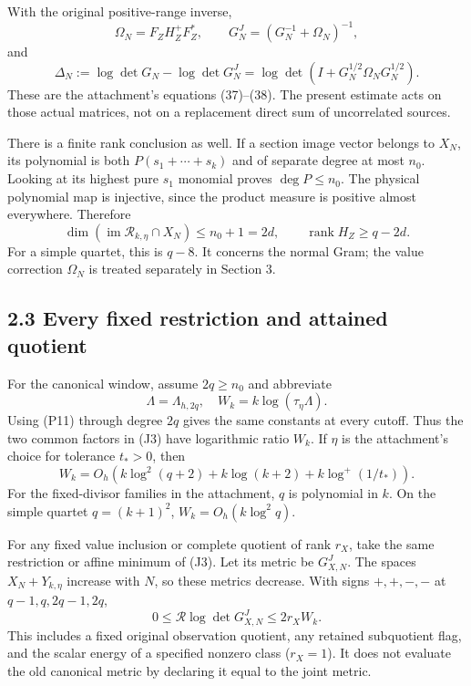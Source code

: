 With the original positive-range inverse, \[
 \Omega_N=F_ZH_Z^+F_Z^*,\qquad
 G_N^J=(G_N^{-1}+\Omega_N)^{-1}, \tag{J7}
\] and \[
 \Delta_N:=\log\det G_N-\log\det G_N^J
 =\log\det(I+G_N^{1/2}\Omega_NG_N^{1/2}). \tag{J8}
\] These are the attachment's equations (37)--(38). The present estimate acts on those actual matrices, not on a replacement direct sum of uncorrelated sources.

There is a finite rank conclusion as well. If a section image vector belongs to \(X_N\), its polynomial is both \(P(s_1+\cdots+s_k)\) and of separate degree at most \(n_0\). Looking at its highest pure \(s_1\) monomial proves \(\deg P\le n_0\). The physical polynomial map is injective, since the product measure is positive almost everywhere. Therefore \[
 \dim(\operatorname{im}\mathcal R_{k,\eta}\cap X_N)\le n_0+1=2d,
 \qquad
 \boxed{\operatorname{rank}H_Z\ge q-2d.} \tag{J9}
\] For a simple quartet, this is \(q-8\). It concerns the normal Gram; the value correction \(\Omega_N\) is treated separately in Section 3.

\subsection{2.3 Every fixed restriction and attained quotient}\label{every-fixed-restriction-and-attained-quotient}

For the canonical window, assume \(2q\ge n_0\) and abbreviate \[
 \Lambda=\Lambda_{h,2q},\quad
 W_k=k\log(\tau_\eta\Lambda).
\] Using (P11) through degree \(2q\) gives the same constants at every cutoff. Thus the two common factors in (J3) have logarithmic ratio \(W_k\). If \(\eta\) is the attachment's choice for tolerance \(t_*>0\), then \[
 W_k=O_h\!\left(k\log^2(q+2)+k\log(k+2)+k\log^+(1/t_*)\right).
 \tag{J10}
\] For the fixed-divisor families in the attachment, \(q\) is polynomial in \(k\). On the simple quartet \(q=(k+1)^2\), \(W_k=O_h(k\log^2 q)\).

For any fixed value inclusion or complete quotient of rank \(r_X\), take the same restriction or affine minimum of (J3). Let its metric be \(G_{X,N}^J\). The spaces \(X_N+Y_{k,\eta}\) increase with \(N\), so these metrics decrease. With signs \(+,+,-,-\) at \(q-1,q,2q-1,2q\), \[
 \boxed{
 0\le\mathcal R\log\det G_{X,N}^J\le2r_X W_k.
 } \tag{J11}
\] This includes a fixed original observation quotient, any retained subquotient flag, and the scalar energy of a specified nonzero class (\(r_X=1\)). It does not evaluate the old canonical metric by declaring it equal to the joint metric.

